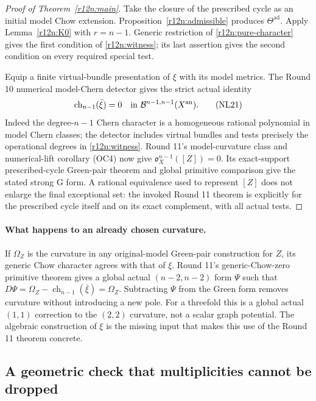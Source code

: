 \begin{proof}[Proof of Theorem~\ref{r12n:main}]
Take the closure of the prescribed cycle as an initial model Chow
extension.  Proposition~\ref{r12n:admissible} produces
$\Theta^{\mathrm{ad}}$.  Apply Lemma~\ref{r12n:K0} with $r=n-1$.
Generic restriction of \eqref{r12n:pure-character} gives the first
condition of \eqref{r12n:witness}; its last assertion gives the
second condition on every required special test.

Equip a finite virtual-bundle presentation of $\xi$ with its model
metrics.  The Round 10 numerical model-Chern detector gives the
strict actual identity
\[
               \operatorname{ch}_{n-1}(\bar\xi)=0
                         \quad\hbox{in }\mathcal B^{n-1,n-1}(X^{\mathrm{an}}).
\tag{NL21}\label{r12n:actual-zero}
\]
Indeed the degree-$n-1$ Chern character is a homogeneous rational
polynomial in model Chern classes; the detector includes virtual
bundles and tests precisely the operational degrees in
\eqref{r12n:witness}.  Round 11's model-curvature class and
numerical-lift corollary (OC4) now give
$\mathfrak o_X^{n-1}([Z])=0$.  Its exact-support prescribed-cycle
Green-pair theorem and global primitive comparison give the stated
strong G form.  A rational equivalence used to represent $[Z]$
does not enlarge the final exceptional set: the invoked Round 11
theorem is explicitly for the prescribed cycle itself and on its
exact complement, with all actual tests.
\end{proof}

\paragraph{What happens to an already chosen curvature.}
If $\Omega_Z$ is the curvature in any original-model Green-pair
construction for $Z$, its generic Chow character agrees with that
of $\xi$.  Round 11's generic-Chow-zero primitive theorem gives a
global actual $(n-2,n-2)$ form $\Psi$ such that
$D\Psi=\Omega_Z-\operatorname{ch}_{n-1}(\bar\xi)=\Omega_Z$.
Subtracting $\Psi$ from the Green form removes curvature without
introducing a new pole.  For a threefold this is a global actual
$(1,1)$ correction to the $(2,2)$ curvature, not a scalar graph
potential.  The algebraic construction of $\xi$ is the missing
input that makes this use of the Round 11 theorem concrete.

\subsection{A geometric check that multiplicities cannot be dropped}

